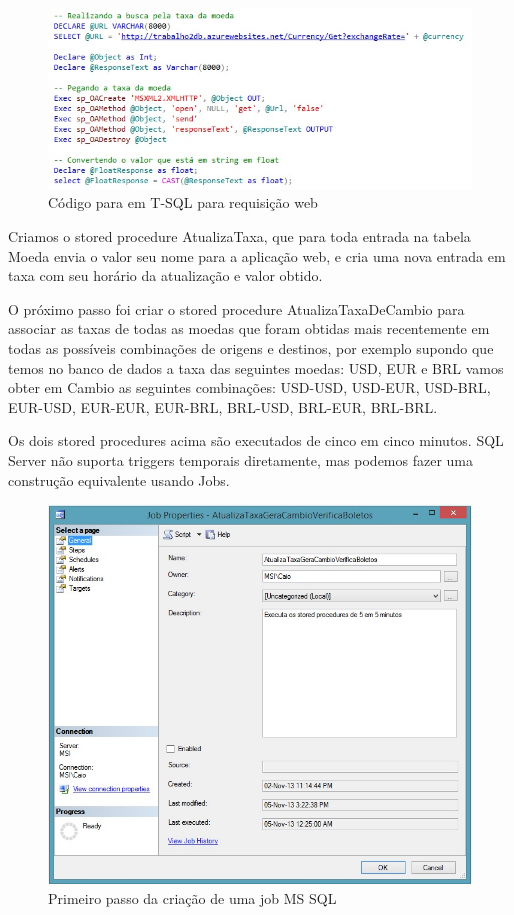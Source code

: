 \documentclass[conference]{IEEEtran}
\begin{document}
\begin{figure}[!t]
      \centering
  	  \includegraphics[scale=0.65]{img/requisicao.jpg}
      \caption{Código para em T-SQL para requisição web}
    \end{figure}

  	Criamos o stored procedure AtualizaTaxa, que para toda entrada na tabela Moeda envia o valor seu nome para a aplicação web, e cria uma nova entrada em taxa com seu horário da atualização e valor obtido.

  	O próximo passo foi criar o stored procedure AtualizaTaxaDeCambio para associar as taxas de todas as moedas que foram obtidas mais recentemente em todas as possíveis combinações de origens e destinos, por exemplo supondo que temos no banco de dados a taxa das seguintes moedas: USD, EUR e BRL vamos obter em Cambio as seguintes combinações: USD-USD, USD-EUR, USD-BRL, EUR-USD, EUR-EUR, EUR-BRL, BRL-USD, BRL-EUR, BRL-BRL.

  	Os dois stored procedures acima são executados de cinco em cinco minutos. SQL Server não suporta triggers temporais diretamente, mas podemos fazer uma construção equivalente usando Jobs. 

    \begin{figure}[!t]
      \centering
  	  \includegraphics[scale=0.45]{img/job1.jpg}
      \caption{Primeiro passo da criação de uma job MS SQL}
    \end{figure}
\end{document}
